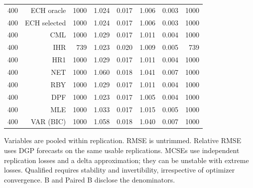 \begin{table}[p]
\begin{tabular}{rrrrrrrr}
400 & ECH oracle & 1000 & 1.024 & 0.017 & 1.006 & 0.003 & 1000 \\
400 & ECH selected & 1000 & 1.024 & 0.017 & 1.006 & 0.003 & 1000 \\
400 & CML & 1000 & 1.029 & 0.017 & 1.011 & 0.004 & 1000 \\
400 & IHR &  739 & 1.023 & 0.020 & 1.009 & 0.005 &  739 \\
400 & HR1 & 1000 & 1.029 & 0.017 & 1.011 & 0.004 & 1000 \\
400 & NET & 1000 & 1.060 & 0.018 & 1.041 & 0.007 & 1000 \\
400 & RBY & 1000 & 1.029 & 0.017 & 1.011 & 0.004 & 1000 \\
400 & DPF & 1000 & 1.023 & 0.017 & 1.005 & 0.004 & 1000 \\
400 & MLE & 1000 & 1.033 & 0.017 & 1.015 & 0.005 & 1000 \\
400 & VAR (BIC) & 1000 & 1.058 & 0.018 & 1.040 & 0.007 & 1000 \\
\bottomrule\end{tabular}
\par\medskip
\begin{minipage}{0.98\linewidth}\footnotesize Variables are pooled within replication. RMSE is untrimmed. Relative RMSE uses DGP forecasts on the same usable replications. MCSEs use independent replication losses and a delta approximation; they can be unstable with extreme losses. Qualified requires stability and invertibility, irrespective of optimizer convergence. B and Paired B disclose the denominators.\end{minipage}
\end{table}
